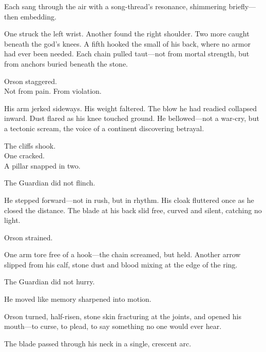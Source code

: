 \documentclass[12pt]{article}
\begin{document}
\vspace{0.5em}
Each sang through the air with a song-thread’s resonance, shimmering briefly---then embedding.

\vspace{0.5em}
One struck the left wrist. Another found the right shoulder. Two more caught beneath the god’s knees. A fifth hooked the small of his back, where no armor had ever been needed. Each chain pulled taut---not from mortal strength, but from anchors buried beneath the stone.

\vspace{0.5em}
Orson staggered.\\
Not from pain. From violation.

\vspace{0.5em}
His arm jerked sideways. His weight faltered. The blow he had readied collapsed inward. Dust flared as his knee touched ground. He bellowed---not a war-cry, but a tectonic scream, the voice of a continent discovering betrayal.

\vspace{0.5em}
The cliffs shook.\\
One cracked.\\
A pillar snapped in two.

\vspace{0.5em}
The Guardian did not flinch.

\vspace{0.5em}
He stepped forward---not in rush, but in rhythm. His cloak fluttered once as he closed the distance. The blade at his back slid free, curved and silent, catching no light.

\vspace{0.5em}
Orson strained.

\vspace{0.5em}
One arm tore free of a hook---the chain screamed, but held. Another arrow slipped from his calf, stone dust and blood mixing at the edge of the ring.

\vspace{0.5em}
The Guardian did not hurry.

\vspace{0.5em}
He moved like memory sharpened into motion.

\vspace{0.5em}
Orson turned, half-risen, stone skin fracturing at the joints, and opened his mouth---to curse, to plead, to say something no one would ever hear.

\vspace{0.5em}
The blade passed through his neck in a single, crescent arc.
\end{document}

